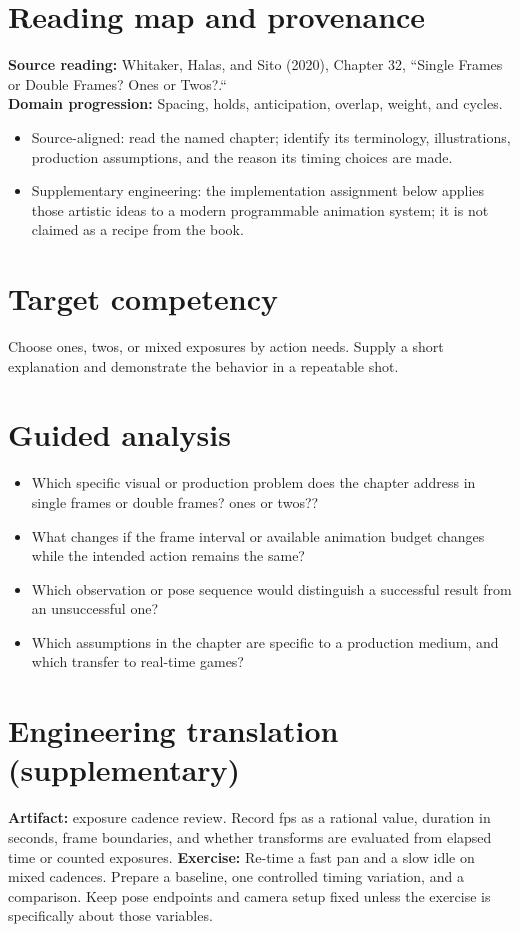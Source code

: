 \documentclass[10pt,letterpaper]{article}
\begin{document}
\makedoctitle
\makedocsummary

\section{Reading map and provenance}
\textbf{Source reading:} Whitaker, Halas, and Sito (2020), Chapter 32, ``Single Frames or Double Frames? Ones or Twos?.``\\
\textbf{Domain progression:} Spacing, holds, anticipation, overlap, weight, and cycles.
\begin{itemize}
\item Source-aligned: read the named chapter; identify its terminology, illustrations, production assumptions, and the reason its timing choices are made.
\item Supplementary engineering: the implementation assignment below applies those artistic ideas to a modern programmable animation system; it is not claimed as a recipe from the book.
\end{itemize}
\section{Target competency}
Choose ones, twos, or mixed exposures by action needs. Supply a short explanation and demonstrate the behavior in a repeatable shot.
\section{Guided analysis}
\begin{itemize}
\item Which specific visual or production problem does the chapter address in single frames or double frames? ones or twos??
\item What changes if the frame interval or available animation budget changes while the intended action remains the same?
\item Which observation or pose sequence would distinguish a successful result from an unsuccessful one?
\item Which assumptions in the chapter are specific to a production medium, and which transfer to real-time games?
\end{itemize}
\section{Engineering translation (supplementary)}
\textbf{Artifact:} exposure cadence review. Record fps as a rational value, duration in seconds, frame boundaries, and whether transforms are evaluated from elapsed time or counted exposures.
\textbf{Exercise:} Re-time a fast pan and a slow idle on mixed cadences. Prepare a baseline, one controlled timing variation, and a comparison. Keep pose endpoints and camera setup fixed unless the exercise is specifically about those variables.
\end{document}
